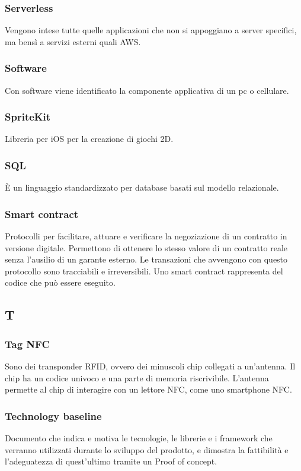 \subsubsection*{Serverless} Vengono intese tutte quelle applicazioni che non si appoggiano a server specifici, ma bensì a servizi esterni quali AWS.
\subsubsection*{Software} Con software viene identificato la componente applicativa di un pc o cellulare.
\subsubsection*{SpriteKit} Libreria per iOS per la creazione di giochi 2D.
\subsubsection*{SQL} È un linguaggio standardizzato per database basati sul modello relazionale.
\subsubsection*{Smart contract} Protocolli per facilitare, attuare e verificare la negoziazione di un contratto in versione digitale.
Permettono di ottenere lo stesso valore di un contratto reale senza l'ausilio di un garante esterno. Le transazioni che avvengono con questo protocollo sono tracciabili e irreversibili. Uno smart contract rappresenta del codice che può essere eseguito.
\subsection*{T}
\subsubsection*{Tag NFC} Sono dei transponder RFID, ovvero dei minuscoli chip collegati a un'antenna. Il chip ha un codice univoco e una parte di memoria riscrivibile. L'antenna permette al chip di interagire con un lettore NFC, come uno smartphone NFC.
\subsubsection*{Technology baseline} Documento che indica e motiva le tecnologie, le librerie e
i framework che verranno utilizzati durante lo sviluppo del prodotto, e dimostra la fattibilità e l'adeguatezza di quest'ultimo tramite un Proof of concept.

